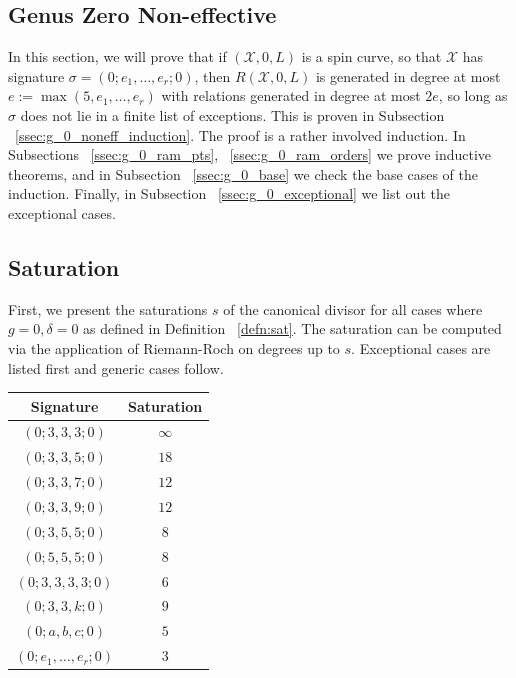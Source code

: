 \documentclass{amsart}
\theoremstyle{plain}
\theoremstyle{definition}
\theoremstyle{remark}
\numberwithin{equation}{section}
\newcommand\ssec{\subsection}
\newcommand \sx{\mathscr X}
\begin{document}
\ssec{Genus Zero Non-effective}
\label{sec:g_0_non_effective}


In this section, we will prove that if $(\sx , 0, L)$ is a spin curve,
so that $\sx$ has signature $\sigma = (0; e_1, \ldots , e_r; 0)$, then
$R(\sx , 0, L)$ is generated in degree at most $e := \max(5, e_1, \ldots,
e_r)$ with relations generated in degree at most $2e$, so long as $\sigma$
does not lie in a finite list of exceptions. This is proven in
Subsection ~\ref{ssec:g_0_noneff_induction}. The proof is a rather
involved induction. In Subsections ~\ref{ssec:g_0_ram_pts},
~\ref{ssec:g_0_ram_orders} we prove inductive theorems, and in
Subsection ~\ref{ssec:g_0_base} we check the base cases of the
induction. Finally, in Subsection ~\ref{ssec:g_0_exceptional} we
list out the exceptional cases.

\ssec{Saturation}
\label{ssec:g_0_saturation}
First, we present the saturations $s$ of the canonical divisor for
all cases where $g = 0, \delta = 0$ as defined in Definition
~\ref{defn:sat}. The saturation can be computed via the application
of Riemann-Roch on degrees up to $s$. Exceptional cases are listed
first and generic cases follow.

\begin{longtable}
	{| c | c |}
	\hline
	Signature & Saturation \\
	\hline
	\hline

	$(0; 3, 3, 3; 0)$ & $\infty$ \\	\hline

	$(0; 3, 3, 5; 0)$ & $18$ \\	\hline
	
	$(0; 3, 3, 7; 0)$ & $12$ \\	\hline
	
	$(0; 3, 3, 9; 0)$ & $12$ \\	\hline
	
	$(0; 3, 5, 5; 0)$ & $8$ \\	\hline
	
	$(0; 5, 5, 5; 0)$ & $8$ \\	\hline
	
	$(0; 3, 3, 3, 3; 0)$ & $6$ \\	\hline
	
	\hline
	\hline
	
	$(0; 3, 3, k; 0)$ & $9$ \\	\hline
	
	$(0; a, b, c; 0)$ & $5$ \\	\hline
	
	$(0; e_1, \ldots, e_r; 0)$ & $3$ \\	\hline
\end{longtable}
\end{document}
